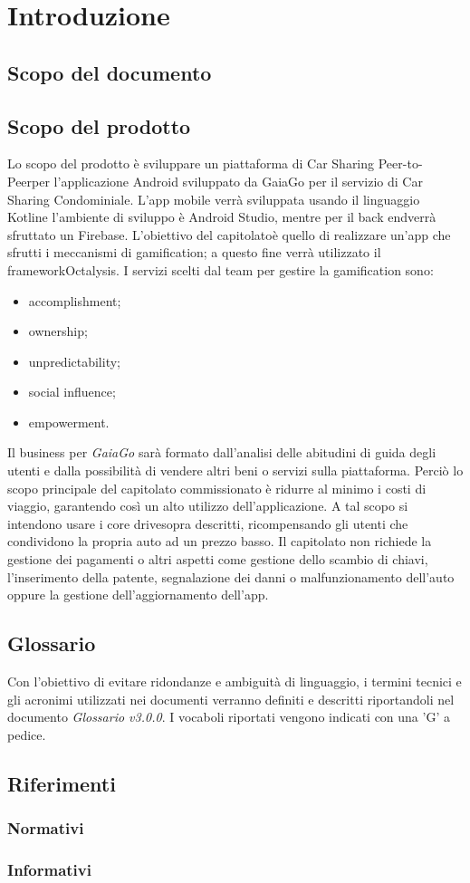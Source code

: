 \section{Introduzione} 
\subsection{Scopo del documento}

\subsection{Scopo del prodotto}
Lo scopo del prodotto è sviluppare un piattaforma di Car Sharing Peer-to-Peer\glosp  per l'applicazione Android sviluppato da GaiaGo per il servizio di Car Sharing Condominiale. L'app mobile verrà sviluppata usando il linguaggio Kotlin\glosp e l'ambiente di sviluppo è Android Studio, mentre per il back end\glosp verrà sfruttato un Firebase\glo. L'obiettivo del capitolato\glosp è quello di realizzare un'app che sfrutti i meccanismi di gamification\glo; a questo fine verrà utilizzato il framework\glosp Octalysis\glo. I servizi scelti dal team per gestire la gamification sono:
\begin{itemize}
	\item {accomplishment};
	\item {ownership};
	\item {unpredictability};
	\item {social influence};
	\item {empowerment}.
\end{itemize}
Il business per \textit{GaiaGo} sarà formato dall'analisi delle abitudini di guida degli utenti e dalla possibilità di vendere altri beni o servizi sulla piattaforma. Perciò lo scopo principale del capitolato commissionato è ridurre al minimo i costi di viaggio, garantendo così un alto utilizzo dell'applicazione. 
A tal scopo si intendono usare i core drive\glosp sopra descritti, ricompensando gli utenti che condividono la propria auto ad un prezzo basso. Il capitolato non richiede la gestione dei pagamenti o altri aspetti come gestione dello scambio di chiavi, l'inserimento della patente, segnalazione dei danni o malfunzionamento dell'auto oppure la gestione dell'aggiornamento dell'app.

\subsection{Glossario}
Con l’obiettivo di evitare ridondanze e ambiguità di linguaggio, i termini tecnici e gli acronimi utilizzati nei documenti verranno definiti e descritti riportandoli nel documento \textit{Glossario v3.0.0}.  I vocaboli riportati vengono indicati con una 'G' a pedice.
\subsection{Riferimenti}
\subsubsection{Normativi}

\subsubsection{Informativi}
